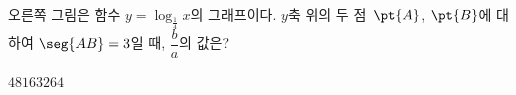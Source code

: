 \noindent\begin{minipage}[t]{0.58\linewidth}\vspace{0pt}\raggedright 오른쪽 그림은 함수 $y=\log_{\frac{1}{4}} x$의 그래프이다. $y$축 위의 두 점~$\pt{A}$, $\pt{B}$에 대하여 $\seg{AB}=3$일 때, $\dfrac{b}{a}$의 값은?\end{minipage}\hfill\begin{minipage}[t]{0.4\linewidth}\vspace{0pt}\centering \resizebox{\ifdim\width>\linewidth\linewidth\else\width\fi}{!}{}\end{minipage}\par
\begin{choicesii}{$4$}{$8$}{$16$}{$32$}{$64$}\end{choicesii}
